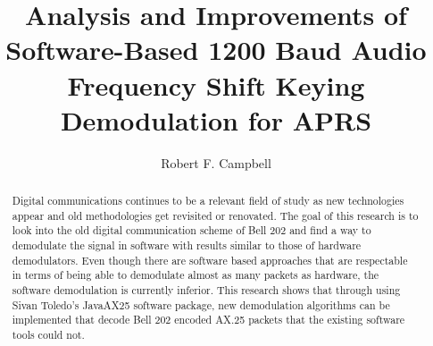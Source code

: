 \documentclass[12pt]{ucthesis}
\begin{document}
\title{Analysis and Improvements of Software-Based 1200 Baud Audio Frequency Shift Keying Demodulation for APRS}
\author{Robert F. Campbell}
  
 
     
\maketitle

\begin{frontmatter}

\copyrightpage

\committeemembershippage

\begin{abstract}
Digital communications continues to be a relevant field of study as new technologies appear and old methodologies get revisited or renovated. The goal of this research is to look into the old digital communication scheme of Bell 202 \cite{stauffer1984fsk} and find a way to demodulate the signal in software with results similar to those of hardware demodulators. Even though there are software based approaches that are respectable in terms of being able to demodulate almost as many packets as hardware, the software demodulation is currently inferior. This research shows that through using Sivan Toledo's JavaAX25 \cite{javax25github} software package, new demodulation algorithms can be implemented that decode Bell 202 encoded AX.25 packets that the existing software tools could not.
\end{abstract}


\tableofcontents
\listoffigures

\end{frontmatter}















\end{document}
